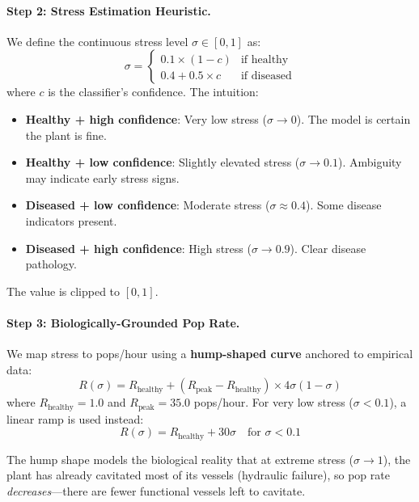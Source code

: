 \documentclass[11pt,a4paper,twocolumn]{article}
\begin{document}
\paragraph{Step 2: Stress Estimation Heuristic.} We define the continuous stress level $\sigma \in [0, 1]$ as:
\begin{equation}
    \sigma = \begin{cases}
        0.1 \times (1 - c) & \text{if healthy} \\
        0.4 + 0.5 \times c & \text{if diseased}
    \end{cases}
    \label{eq:stress}
\end{equation}
where $c$ is the classifier's confidence. The intuition:
\begin{itemize}[nosep]
    \item \textbf{Healthy + high confidence}: Very low stress ($\sigma \to 0$). The model is certain the plant is fine.
    \item \textbf{Healthy + low confidence}: Slightly elevated stress ($\sigma \to 0.1$). Ambiguity may indicate early stress signs.
    \item \textbf{Diseased + low confidence}: Moderate stress ($\sigma \approx 0.4$). Some disease indicators present.
    \item \textbf{Diseased + high confidence}: High stress ($\sigma \to 0.9$). Clear disease pathology.
\end{itemize}

The value is clipped to $[0, 1]$.

\paragraph{Step 3: Biologically-Grounded Pop Rate.} We map stress to pops/hour using a \textbf{hump-shaped curve} anchored to empirical data:
\begin{equation}
    R(\sigma) = R_{\text{healthy}} + (R_{\text{peak}} - R_{\text{healthy}}) \times 4\sigma(1 - \sigma)
\end{equation}
where $R_{\text{healthy}} = 1.0$ and $R_{\text{peak}} = 35.0$ pops/hour. For very low stress ($\sigma < 0.1$), a linear ramp is used instead:
\begin{equation}
    R(\sigma) = R_{\text{healthy}} + 30\sigma \quad \text{for } \sigma < 0.1
\end{equation}

The hump shape models the biological reality that at extreme stress ($\sigma \to 1$), the plant has already cavitated most of its vessels (hydraulic failure), so pop rate \emph{decreases}---there are fewer functional vessels left to cavitate.
\end{document}
